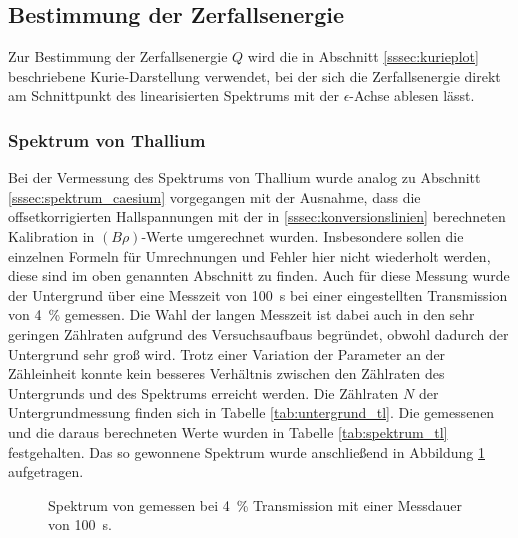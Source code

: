 \documentclass[11pt, a4paper]{article}
\numberwithin{equation}{section}
\begin{document}
\subsection{Bestimmung der Zerfallsenergie}
Zur Bestimmung der Zerfallsenergie $Q$ wird die in Abschnitt \ref{sssec:kurieplot} beschriebene Kurie-Darstellung verwendet, bei der sich die Zerfallsenergie direkt am Schnittpunkt des linearisierten Spektrums mit der $\epsilon$-Achse ablesen lässt.

\subsubsection{Spektrum von Thallium}
\begin{table}
	\centering
	
	\caption{Untergrundmessung von  mit Messdauer \SI{100}{\second} bei \SI{4}{\percent} Transmission.}
	\label{tab:untergrund_tl}
\end{table}
Bei der Vermessung des Spektrums von Thallium wurde analog zu Abschnitt \ref{sssec:spektrum_caesium} vorgegangen mit der Ausnahme, dass die offsetkorrigierten Hallspannungen mit der in \ref{sssec:konversionslinien} berechneten Kalibration in $(B \rho)$-Werte umgerechnet wurden.
Insbesondere sollen die einzelnen Formeln für Umrechnungen und Fehler hier nicht wiederholt werden, diese sind im oben genannten Abschnitt zu finden.
Auch für diese Messung wurde der Untergrund über eine Messzeit von \SI{100}{\second} bei einer eingestellten Transmission von \SI{4}{\percent} gemessen.
Die Wahl der langen Messzeit ist dabei auch in den sehr geringen Zählraten aufgrund des Versuchsaufbaus begründet, obwohl dadurch der Untergrund sehr groß wird.
Trotz einer Variation der Parameter an der Zähleinheit konnte kein besseres Verhältnis zwischen den Zählraten des Untergrunds und des Spektrums erreicht werden.
Die Zählraten $N$ der Untergrundmessung finden sich in Tabelle \ref{tab:untergrund_tl}.
Die gemessenen und die daraus berechneten Werte wurden in Tabelle \ref{tab:spektrum_tl} festgehalten.
Das so gewonnene Spektrum wurde anschließend in Abbildung \ref{fig:thallium_spectrum} aufgetragen.
\begin{figure}[h]
	\centering
	
	\caption{Spektrum von  gemessen bei \SI{4}{\percent} Transmission mit einer Messdauer von \SI{100}{\second}.}
	\label{fig:thallium_spectrum}
\end{figure}
\end{document}
